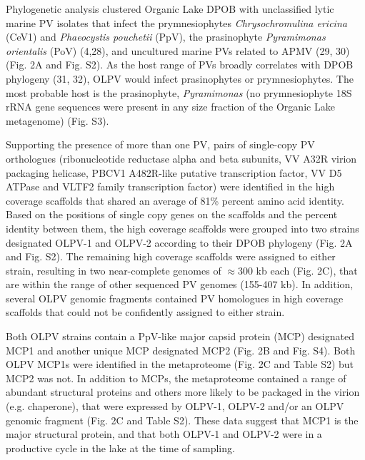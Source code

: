 Phylogenetic analysis clustered Organic Lake DPOB with unclassified lytic marine PV isolates that infect the prymnesiophytes \emph{Chrysochromulina ericina} (CeV1) and \emph{Phaeocystis pouchetii} (PpV),
 the prasinophyte \emph{Pyramimonas orientalis} (PoV) (4,28), and uncultured marine PVs related to APMV (29, 30) (Fig. 2A and Fig. S2). 
As the host range of PVs broadly correlates with DPOB phylogeny (31, 32), OLPV would infect prasinophytes or prymnesiophytes. 
The most probable host is the prasinophyte, \emph{Pyramimonas} (no prymnesiophyte 18S rRNA gene sequences were present in any size fraction of the Organic Lake metagenome) (Fig. S3).

Supporting the presence of more than one PV, pairs of single-copy PV orthologues 
(ribonucleotide reductase alpha and beta subunits, VV A32R virion packaging helicase, PBCV1 A482R-like putative transcription factor, VV D5 ATPase and VLTF2 family transcription factor) 
were identified in the high coverage scaffolds that shared an average of 81\% percent amino acid identity.
 Based on the positions of single copy genes on the scaffolds and the percent identity between them, the high coverage scaffolds were grouped into two strains designated OLPV-1 and OLPV-2 according to their DPOB phylogeny (Fig. 2A and Fig. S2).
 The remaining high coverage scaffolds were assigned to either strain, resulting in two near-complete genomes of $\approx$300 kb each (Fig. 2C), 
that are within the range of other sequenced PV genomes (155-407 kb). 
In addition, several OLPV genomic fragments contained PV homologues in high coverage scaffolds that could not be confidently assigned to either strain. 

Both OLPV strains contain a PpV-like major capsid protein (MCP) designated MCP1 and another unique MCP designated MCP2 (Fig. 2B and Fig. S4). 
Both OLPV MCP1s were identified in the metaproteome (Fig. 2C and Table S2) but MCP2 was not. 
In addition to MCPs, the metaproteome contained a range of abundant structural proteins and others more likely to be packaged in the virion (e.g. chaperone), that were expressed by OLPV-1, OLPV-2 and/or an OLPV genomic fragment (Fig. 2C and Table S2). 
These data suggest that MCP1 is the major structural protein, and that both OLPV-1 and OLPV-2 were in a productive cycle in the lake at the time of sampling. 

